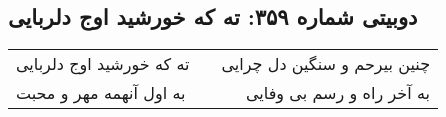 \begin{center}
\section*{دوبیتی شماره ۳۵۹: ته که خورشید اوج دلربایی}
\label{sec:359}
\begin{longtable}{l p{0.5cm} r}
ته که خورشید اوج دلربایی
&&
چنین بیرحم و سنگین دل چرایی
\\
به اول آنهمه مهر و محبت
&&
به آخر راه و رسم بی وفایی
\\
\end{longtable}
\end{center}
